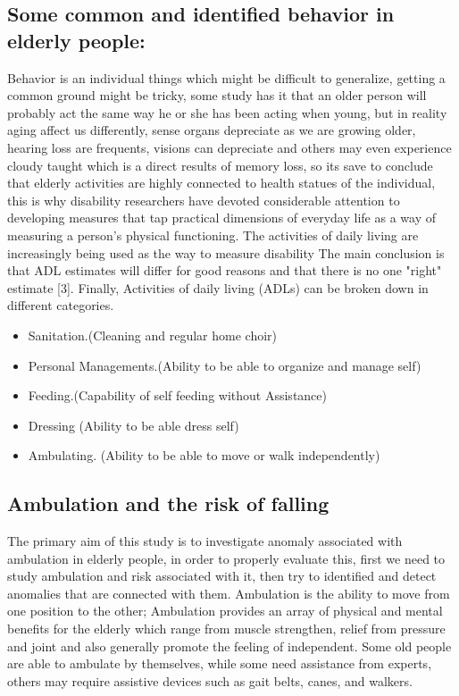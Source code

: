 \documentclass[a4paper, parskip=full]{scrartcl}
\begin{document}
\subsection*{Some common and identified behavior in elderly people:}

 Behavior is an individual things which might be difficult to generalize, getting a common ground might be tricky, some study has it that an older person will probably act the same way he or she has been acting when young, but in reality aging affect us differently, sense organs depreciate as we are growing older, hearing loss are frequents, visions can depreciate and others may even experience cloudy taught which is a direct results of memory loss, so its save to conclude that elderly activities are highly connected to health statues of the individual, this is why disability researchers have devoted considerable attention to developing measures that tap practical dimensions of everyday life as a way of measuring a person's physical functioning. The activities of daily living are increasingly being used as the way to measure disability The main conclusion is that ADL estimates will differ for good reasons and that there is no one "right" estimate [3]. Finally, Activities of daily living (ADLs) can be broken down in different categories.
\begin{itemize}
	
	\item   Sanitation.(Cleaning and regular home choir)
	
	\item  Personal Managements.(Ability to be able to organize and manage self)
	
	\item   Feeding.(Capability of self feeding without Assistance)
	
	\item	Dressing (Ability to be able dress self)
	
	\item 	Ambulating. (Ability to be able to move or walk independently)	
	
\end{itemize}

\subsection*{Ambulation and the risk of falling}

The primary aim of this study is to investigate anomaly associated with ambulation in elderly people, in order to properly evaluate this, first we need to study ambulation and risk associated with it, then try to identified and detect anomalies that are connected with them. Ambulation is the ability to move from one position to the other; Ambulation provides an array of physical and mental benefits for the elderly which range from muscle strengthen, relief from pressure and joint and also generally promote the feeling of independent. Some old people are able to ambulate by themselves, while some need assistance from experts, others may require assistive devices such as gait belts, canes, and walkers. 
\end{document}
